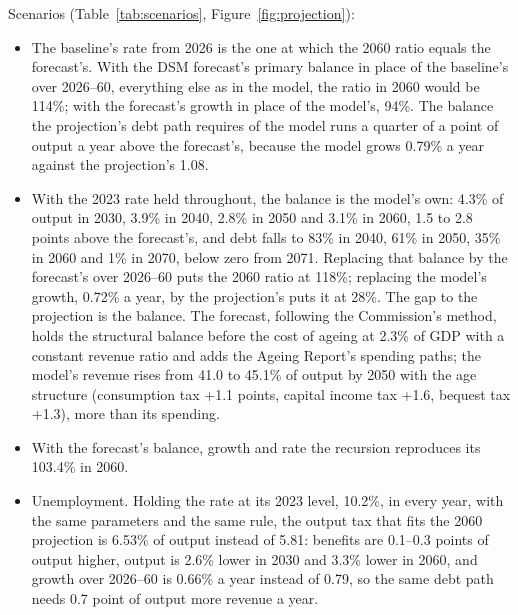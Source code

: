 \documentclass[11pt,a4paper]{article}
\begin{document}
\noindent Scenarios (Table~\ref{tab:scenarios}, Figure~\ref{fig:projection}):
\begin{itemize}
\item The baseline's rate from 2026 is the one at which the 2060 ratio equals
  the forecast's. With the DSM forecast's primary balance in place of the
  baseline's over 2026--60, everything else as in the model, the ratio in
  2060 would be 114\%; with the forecast's growth in place of the model's,
  94\%. The balance the projection's debt path requires of the model runs a
  quarter of a point of output a year above the forecast's, because the
  model grows 0.79\% a year against the projection's 1.08.
\item With the 2023 rate held throughout, the balance is the model's own:
  4.3\% of output in 2030, 3.9\% in 2040, 2.8\% in 2050 and 3.1\% in 2060,
  1.5 to 2.8 points above the forecast's, and debt falls to 83\% in 2040,
  61\% in 2050, 35\% in 2060 and 1\% in 2070, below zero from 2071.
  Replacing that balance by the forecast's over 2026--60 puts the 2060
  ratio at 118\%; replacing the model's growth, 0.72\% a year, by the
  projection's puts it at 28\%. The gap to the projection is the balance.
  The forecast, following the Commission's method, holds the structural
  balance before the cost of ageing
  at 2.3\% of GDP with a constant revenue ratio and adds the Ageing
  Report's spending paths; the model's revenue rises from 41.0 to 45.1\%
  of output by 2050 with the age structure (consumption tax +1.1 points,
  capital income tax +1.6, bequest tax +1.3), more than its spending.
\item With the forecast's balance, growth and rate the recursion
  reproduces its 103.4\% in 2060.
\item Unemployment. Holding the rate at its 2023 level, 10.2\%, in every
  year, with the same parameters and the same rule, the output tax that
  fits the 2060 projection is 6.53\% of output instead of 5.81: benefits
  are 0.1--0.3 points of output higher, output is 2.6\% lower in 2030 and
  3.3\% lower in 2060, and growth over 2026--60 is 0.66\% a year instead of
  0.79, so the same debt path needs 0.7 point of output more revenue a
  year.
\end{itemize}
\end{document}
